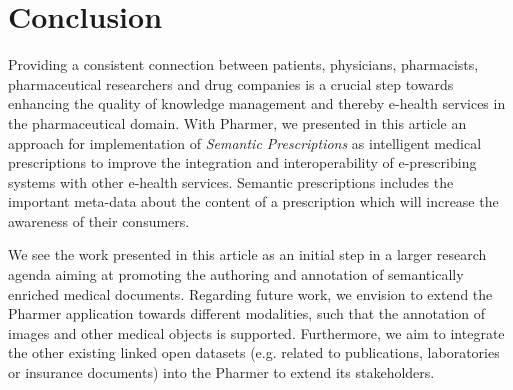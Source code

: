 \documentclass[10pt, conference, compsocconf]{IEEEtran}
\begin{document}
\section{Conclusion}
\label{sec:conclusion}
Providing a consistent connection between patients, physicians, pharmacists, pharmaceutical researchers and drug companies is a crucial step towards enhancing the quality of knowledge management and thereby e-health services in the pharmaceutical domain.
With Pharmer, we presented in this article an approach for implementation of \emph{Semantic Prescriptions} as intelligent medical prescriptions to improve the integration and interoperability of e-prescribing systems with other e-health services.
Semantic prescriptions includes the important meta-data about the content of a prescription which will increase the awareness of their consumers.

We see the work presented in this article as an initial step in a larger research agenda aiming at promoting the authoring and annotation of semantically enriched medical documents.
Regarding future work, we envision to extend the Pharmer application towards different modalities, such that the annotation of images and other medical objects is supported.
Furthermore, we aim to integrate the other existing linked open datasets (e.g. related to publications, laboratories or insurance documents) into the Pharmer to extend its stakeholders.


\begin{spacing}{0.5}


\end{spacing}


\end{document}

